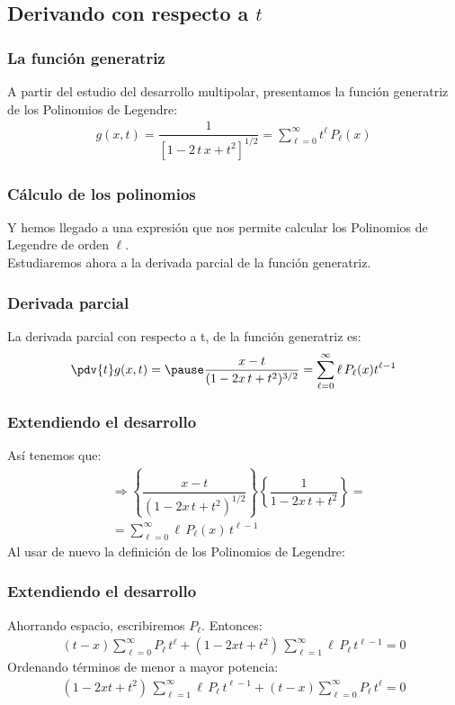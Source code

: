 \subsection{Derivando con respecto a \texorpdfstring{$t$}{t}}
\begin{frame}
\frametitle{La función generatriz}
A partir del estudio del desarrollo multipolar, presentamos la función generatriz de los Polinomios de Legendre:
\begin{align*}
g(x, t) = \dfrac{1}{\left[ 1 - 2 \, t \, x + t^{2} \right]^{1/2} } = \sum_{\ell=0}^{\infty} t^{\ell} \, P_{\ell} (x)
\end{align*}
\end{frame}
\begin{frame}
\frametitle{Cálculo de los polinomios}
Y hemos llegado a una expresión que nos permite calcular los Polinomios de Legendre de orden $\ell$.
\\
\bigskip
\pause
Estudiaremos ahora a la derivada parcial de la función generatriz.
\end{frame}
\begin{frame}
\frametitle{Derivada parcial}
La derivada parcial con respecto a t, de la función generatriz es:
\begin{eqnarray*}
\pdv{t} g(x, t) = \pause \dfrac{x - t}{( 1 - 2 x \, t + t^{2})^{3/2}} = \sum_{\ell=0}^{\infty} \ell \, P_{\ell} (x) t^{\ell -1}
\end{eqnarray*}
\end{frame}
\begin{frame}
\frametitle{Extendiendo el desarrollo}
Así tenemos que:
\begin{align*}
&\Rightarrow \left\{ \dfrac{x - t}{( 1 - 2 x \, t + t^{2})^{1/2}} \right\} \left\{ \dfrac{1}{ 1 - 2 x \, t + t^{2}} \right\} = \\[0.5em]
&= \sum_{\ell=0}^{\infty} \ell \, P_{\ell} (x) \, t^{\ell -1}
\end{align*}
\pause
Al usar de nuevo la definición de los Polinomios de Legendre:
\end{frame}
\begin{frame}
\frametitle{Extendiendo el desarrollo}
Ahorrando espacio, escribiremos $P_{\ell}$. Entonces:
\begin{align*}
(t {-} x) \sum_{\ell=0}^{\infty} P_{\ell} \, t^{\ell} + ( 1 {-} 2 x t {+} t^{2}) \, \sum_{\ell=1}^{\infty} \ell \, P_{\ell} \, t^{\ell-1} = 0
\end{align*}
\pause
Ordenando términos de menor a mayor potencia:
\begin{align*}
(1 {-} 2 x t {+} t^{2}) \, \sum_{\ell=1}^{\infty} \ell \, P_{\ell} \, t^{\ell-1} {+} (t {-} x) \sum_{\ell=0}^{\infty} P_{\ell} \, t^{\ell} = 0
\end{align*}
\end{frame}
